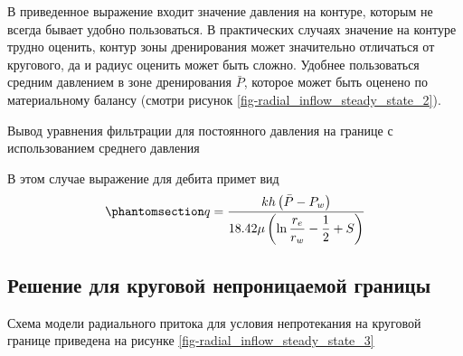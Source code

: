 \documentclass[
  russian,
  letterpaper,
  DIV=11,
  numbers=noendperiod,
  oneside]{scrartcl}
\begin{document}
В приведенное выражение входит значение давления на контуре, которым не
всегда бывает удобно пользоваться. В практических случаях значение на
контуре трудно оценить, контур зоны дренирования может значительно
отличаться от кругового, да и радиус оценить может быть сложно. Удобнее
пользоваться средним давлением в зоне дренирования \(\bar{P}\), которое
может быть оценено по материальному балансу (смотри рисунок
\ref{fig-radial_inflow_steady_state_2}).

Вывод уравнения фильтрации для постоянного давления на границе с
использованием среднего давления

В этом случае выражение для дебита примет вид
\begin{equation}\phantomsection\label{eq-dupui_skin_aver_press}{
q=\frac{kh\left( \bar{P}-P_w\right)}{ 18.42 \mu\left(\ln{\dfrac{r_e}{r_w}}  - \dfrac{1}{2}+ S \right)}
}\end{equation}

\subsection{Решение для круговой непроницаемой
границы}\label{ux440ux435ux448ux435ux43dux438ux435-ux434ux43bux44f-ux43aux440ux443ux433ux43eux432ux43eux439-ux43dux435ux43fux440ux43eux43dux438ux446ux430ux435ux43cux43eux439-ux433ux440ux430ux43dux438ux446ux44b}

Схема модели радиального притока для условия непротекания на круговой
границе приведена на рисунке \ref{fig-radial_inflow_steady_state_3}
\end{document}
